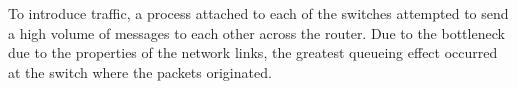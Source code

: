 To introduce traffic, a process attached to each of the switches attempted to send a high volume of messages to each other across the router.
Due to the bottleneck due to the properties of the network links, the greatest queueing effect occurred at the switch where the packets originated.

